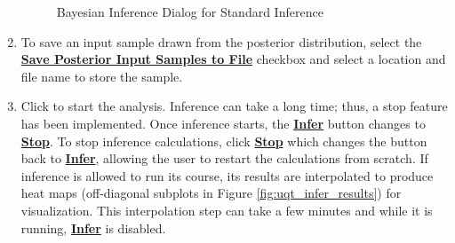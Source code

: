 \begin{enumerate}
{\begin{figure}[H]
\caption{Bayesian Inference Dialog for Standard Inference}
\label{fig:uqt_infer}
\end{figure}
}
\item{To save an input sample drawn from the posterior distribution,
  select the \textbf{\underline{Save Posterior Input Samples to File}} checkbox and
  select a location and file name to store the sample.}
\item{Click  to start the analysis. Inference can take a long
  time; thus, a stop feature has been implemented. Once inference starts,
  the \textbf{\underline{Infer}} button changes to \textbf{\underline{Stop}}. To stop inference
  calculations, click \textbf{\underline{Stop}} which changes the button back to \textbf{\underline{Infer}},
  allowing the user to restart the calculations from scratch. If inference
  is allowed to run its course, its results are interpolated to produce
  heat maps (off-diagonal subplots in Figure \ref{fig:uqt_infer_results}) for
  visualization. This interpolation step can take a few minutes and while
  it is running, \textbf{\underline{Infer}} is disabled.}
\end{enumerate}

